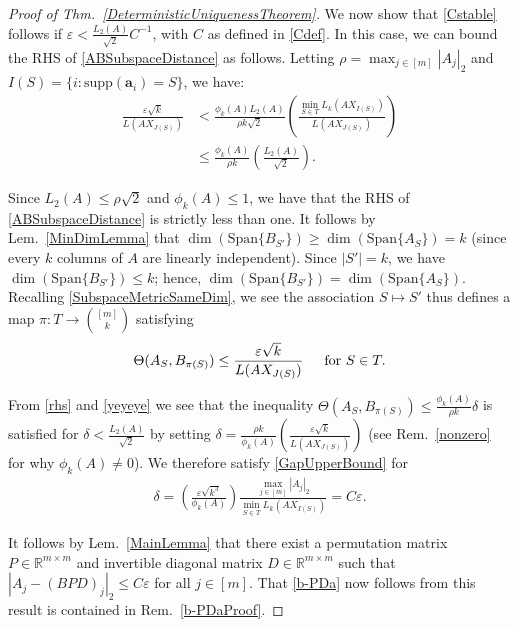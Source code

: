 \documentclass[journal, twocolumn]{IEEEtran}
\begin{document}
\begin{proof}[Proof of Thm.~\ref{DeterministicUniquenessTheorem}]
We now show that \eqref{Cstable} follows if $\varepsilon < \frac{L_2(A)}{\sqrt{2}}C^{-1}$, with $C$ as defined in \eqref{Cdef}. In this case, we can bound the RHS of \eqref {ABSubspaceDistance} as follows. Letting $\rho = \max_{j \in [m]} |A_j|_2$ and $I(S) = \{i: \text{supp}(\mathbf{a}_i)=S\}$, we have:
\begin{align}\label{rhs}
\frac{\varepsilon\sqrt{k}}{L(AX_{J(S)})} 
&<  \frac{\phi_k(A) L_2(A)}{\rho k \sqrt{2}} \left( \frac{\min_{S \in T}L_k(AX_{I(S)})}{L(AX_{J(S)})} \right) \nonumber \\
&\leq \frac{\phi_k(A)}{\rho k} \left( \frac{L_2(A)}{\sqrt{2}} \right).
\end{align}

Since $L_2(A) \leq \rho \sqrt{2}$ and $\phi_k(A) \leq 1$, we have that the RHS of \eqref{ABSubspaceDistance} is strictly less than one. It follows by Lem.~\ref{MinDimLemma} that $\dim(\text{Span}\{B_{S'}\}) \geq \dim(\text{Span}\{A_{S}\}) = k$ (since every $k$ columns of $A$ are linearly independent). Since $|S'| = k$, we have $\dim(\text{Span}\{B_{S'}\}) \leq k$; hence, $\dim(\text{Span}\{B_{S'}\}) = \dim(\text{Span}\{A_{S}\})$. Recalling \eqref{SubspaceMetricSameDim},  we see the association $S \mapsto S'$ thus defines a map $\pi: T \to {[m] \choose k}$ satisfying
\begin{align}\label{yeyeye}
\Theta(A_{S}, B_{\pi(S)}) \leq \frac{\varepsilon\sqrt{k}}{L(AX_{J(S)})} \indent \text{for } S \in T.
\end{align}

From \eqref{rhs} and \eqref{yeyeye} we see that the inequality $\Theta(A_{S}, B_{\pi(S)}) \leq \frac{ \phi_k(A) }{\rho k} \delta$ is satisfied for $\delta < \frac{L_2(A)}{\sqrt{2}}$ by setting $\delta = \frac{ \rho k}{ \phi_k(A) } \left(  \frac{\varepsilon \sqrt{k}}{L(AX_{J(S)})} \right)$ (see Rem.~\ref{nonzero} for why $\phi_k(A) \neq 0$). We therefore satisfy \eqref{GapUpperBound} for 
\begin{align*}
\delta = \left( \frac{ \varepsilon \sqrt{k^3}}{ \phi_k(A) } \right) \frac{\max_{j \in [m]} |A_j|_2}{\min_{S \in T} L_k(AX_{I(S)})}
= C\varepsilon.
\end{align*}

It follows by Lem.~\ref{MainLemma} that there exist a permutation matrix $P \in \mathbb{R}^{m \times m}$ and invertible diagonal matrix $D \in \mathbb{R}^{m \times m}$ such that $|A_j - (BPD)_j|_2 \leq C\varepsilon$ for all $j \in [m]$. That \eqref{b-PDa} now follows from this result is contained in Rem.~\ref{b-PDaProof}.
\end{proof}
\end{document}
